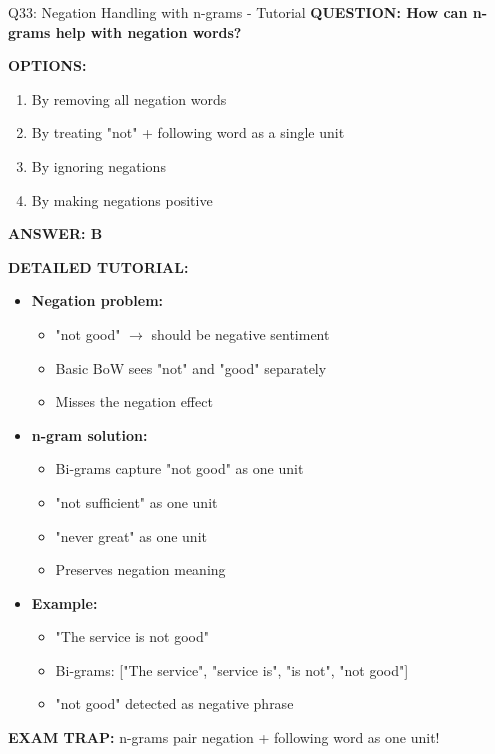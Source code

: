 \documentclass[8pt]{beamer}
\begin{document}
	\begin{frame}{Q33: Negation Handling with n-grams - Tutorial}
		\fontsize{6.5}{7.5}\selectfont
		\textbf{QUESTION: How can n-grams help with negation words?}
		
		\vspace{0.1cm}
		\textbf{OPTIONS:}
		\begin{enumerate}
			\item By removing all negation words
			\item By treating "not" + following word as a single unit
			\item By ignoring negations
			\item By making negations positive
		\end{enumerate}
		
		\vspace{0.1cm}
		\textcolor{myblue}{\textbf{ANSWER: B}}
		
		\vspace{0.1cm}
		\textbf{DETAILED TUTORIAL:}
		\begin{itemize}
			\item \textbf{Negation problem:}
			\begin{itemize}
				\item "not good" $\rightarrow$ should be negative sentiment
				\item Basic BoW sees "not" and "good" separately
				\item Misses the negation effect
			\end{itemize}
			\item \textbf{n-gram solution:}
			\begin{itemize}
				\item Bi-grams capture "not good" as one unit
				\item "not sufficient" as one unit
				\item "never great" as one unit
				\item Preserves negation meaning
			\end{itemize}
			\item \textbf{Example:}
			\begin{itemize}
				\item "The service is not good"
				\item Bi-grams: ["The service", "service is", "is not", "not good"]
				\item "not good" detected as negative phrase
			\end{itemize}
		\end{itemize}
		
		\textcolor{myred}{\textbf{EXAM TRAP:}} n-grams pair \textcolor{myblue}{negation + following word} as one unit!
	\end{frame}
	
\end{document}
